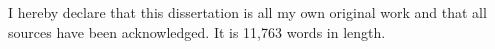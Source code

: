\begin{declaration}

I hereby declare that this dissertation is all my own original work and that all sources have been acknowledged. It is 11,763 words in length.

\end{declaration}